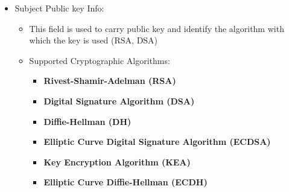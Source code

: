 \documentclass[a4paper]{article}
\begin{document}
\begin{itemize}
            \item Subject Public key Info:
                \begin{itemize}
                    \item This field is used to carry public key and identify the algorithm with which the key is used (RSA, DSA)
                    \item Supported Cryptographic Algorithms:
                        \begin{itemize}
                            \item \textbf{Rivest-Shamir-Adelman (RSA)}
                            \item \textbf{Digital Signature Algorithm (DSA)}
                            \item \textbf{Diffie-Hellman (DH)}
                            \item \textbf{Elliptic Curve Digital Signature Algorithm (ECDSA)}
                            \item \textbf{Key Encryption Algorithm (KEA)}
                            \item \textbf{Elliptic Curve Diffie-Hellman (ECDH)}
                        \end{itemize}
                \end{itemize}
            \end{itemize}
\end{document}
